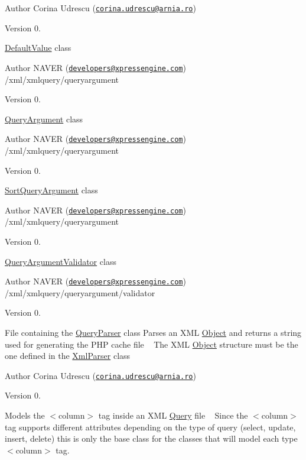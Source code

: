 \begin{DoxyAuthor}{Author}
Corina Udrescu (\href{mailto:corina.udrescu@arnia.ro}{\tt corina.\+udrescu@arnia.\+ro})  
\end{DoxyAuthor}
\begin{DoxyVersion}{Version}
0.
\end{DoxyVersion}
\hyperlink{classDefaultValue}{Default\+Value} class \begin{DoxyAuthor}{Author}
N\+A\+V\+E\+R (\href{mailto:developers@xpressengine.com}{\tt developers@xpressengine.\+com}) /xml/xmlquery/queryargument 
\end{DoxyAuthor}
\begin{DoxyVersion}{Version}
0.
\end{DoxyVersion}
\hyperlink{classQueryArgument}{Query\+Argument} class \begin{DoxyAuthor}{Author}
N\+A\+V\+E\+R (\href{mailto:developers@xpressengine.com}{\tt developers@xpressengine.\+com}) /xml/xmlquery/queryargument 
\end{DoxyAuthor}
\begin{DoxyVersion}{Version}
0.
\end{DoxyVersion}
\hyperlink{classSortQueryArgument}{Sort\+Query\+Argument} class \begin{DoxyAuthor}{Author}
N\+A\+V\+E\+R (\href{mailto:developers@xpressengine.com}{\tt developers@xpressengine.\+com}) /xml/xmlquery/queryargument 
\end{DoxyAuthor}
\begin{DoxyVersion}{Version}
0.
\end{DoxyVersion}
\hyperlink{classQueryArgumentValidator}{Query\+Argument\+Validator} class \begin{DoxyAuthor}{Author}
N\+A\+V\+E\+R (\href{mailto:developers@xpressengine.com}{\tt developers@xpressengine.\+com}) /xml/xmlquery/queryargument/validator 
\end{DoxyAuthor}
\begin{DoxyVersion}{Version}
0.
\end{DoxyVersion}
File containing the \hyperlink{classQueryParser}{Query\+Parser} class Parses an X\+M\+L \hyperlink{classObject}{Object} and returns a string used for generating the P\+H\+P cache file ~\newline
 The X\+M\+L \hyperlink{classObject}{Object} structure must be the one defined in the \hyperlink{classXmlParser}{Xml\+Parser} class

\begin{DoxyAuthor}{Author}
Corina Udrescu (\href{mailto:corina.udrescu@arnia.ro}{\tt corina.\+udrescu@arnia.\+ro})  
\end{DoxyAuthor}
\begin{DoxyVersion}{Version}
0.
\end{DoxyVersion}
Models the $<$column$>$ tag inside an X\+M\+L \hyperlink{classQuery}{Query} file ~\newline
 Since the $<$column$>$ tag supports different attributes depending on the type of query (select, update, insert, delete) this is only the base class for the classes that will model each type $<$column$>$ tag.

